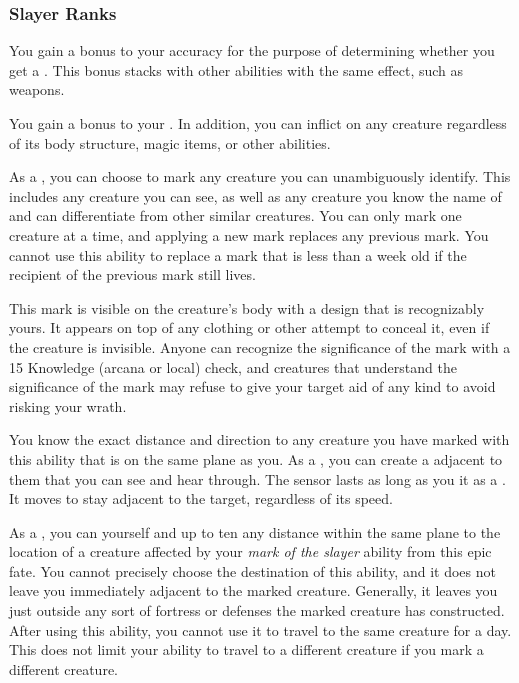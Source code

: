     \subsubsection{Slayer Ranks}
       You gain a  bonus to your accuracy for the purpose of determining whether you get a .
      This bonus stacks with other abilities with the same effect, such as  weapons.

       You gain a  bonus to your .
      In addition, you can inflict  on any creature regardless of its body structure, magic items, or other abilities.

       As a , you can choose to mark any creature you can unambiguously identify.
      This includes any creature you can see, as well as any creature you know the name of and can differentiate from other similar creatures.
      You can only mark one creature at a time, and applying a new mark replaces any previous mark.
      You cannot use this ability to replace a mark that is less than a week old if the recipient of the previous mark still lives.

      This mark is visible on the creature's body with a design that is recognizably yours.
      It appears on top of any clothing or other attempt to conceal it, even if the creature is invisible.
      Anyone can recognize the significance of the mark with a  15 Knowledge (arcana or local) check, and creatures that understand the significance of the mark may refuse to give your target aid of any kind to avoid risking your wrath.

      You know the exact distance and direction to any creature you have marked with this ability that is on the same plane as you.
      As a , you can create a  adjacent to them that you can see and hear through.
      The sensor lasts as long as you  it as a .
      It moves to stay adjacent to the target, regardless of its speed.

       As a , you can  yourself and up to ten  any distance within the same plane to the location of a creature affected by your \textit{mark of the slayer} ability from this epic fate.
      You cannot precisely choose the destination of this ability, and it does not leave you immediately adjacent to the marked creature.
      Generally, it leaves you just outside any sort of fortress or defenses the marked creature has constructed.
      After using this ability, you cannot use it to travel to the same creature for a day.
      This does not limit your ability to travel to a different creature if you mark a different creature.

